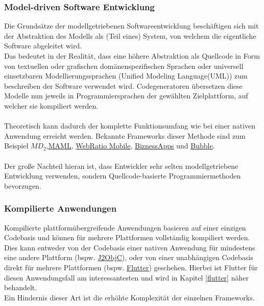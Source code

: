 \subsubsection{Model-driven Software Entwicklung}
Die Grundsätze der modellgetriebenen Softwareentwicklung beschäftigen sich mit der Abstraktion des Modells als (Teil eines) System, von welchem die eigentliche Software abgeleitet wird. \cite{stahl2006}\\
Das bedeutet in der Realität, dass eine höhere Abstraktion als Quellcode in Form von textuellen oder grafischen domänenspezifischen Sprachen oder universell einsetzbaren Modellierungssprachen (Unified Modeling Language(UML)) zum beschreiben der Software verwendet wird. 
Codegeneratoren übersetzen diese Modelle nun jeweils in Programmiersprachen der gewählten Zielplattform, auf welcher sie kompiliert werden.\\
\\
Theoretisch kann dadurch der komplette Funktionsumfang wie bei einer nativen Anwendung erreicht werden.
Bekannte Frameworks dieser Methode sind zum Beispiel \href{https://www.wi.uni-muenster.de/sites/wi/files/public/department/pi/publications/heitkoetter/cross-platform-model-driven-development-of-mobile-applications-with-md2.pdf}{$M\!D_2$},\href{https://www.sciencedirect.com/science/article/abs/pii/S1477842417301215}{MAML}, \href{https://www.webratio.com/site/content/en/home}{WebRatio Mobile}, \href{https://www.biznessapps.com/}{BiznessApps} und \href{https://bubble.io/}{Bubble}.\\
\\
Der große Nachteil hieran ist, dass Entwickler sehr selten modellgetriebene Entwicklung verwenden, sondern Quellcode-basierte Programmiermethoden bevorzugen. \cite{bjorn-hansen2020}
\subsubsection{Kompilierte Anwendungen}
\label{compilierte_anwendungen}
Kompilierte plattformübergreifende Anwendungen basieren auf einer einzigen Codebasis und können für mehrere Plattformen vollständig kompiliert werden. 
Dies kann entweder von der Codebasis einer nativen Anwendung für mindestens eine andere Plattform (bspw. \href{https://developers.google.com/j2objc/}{J2ObjC}), oder von einer unabhängigen Codebasis direkt für mehrere Plattformen (bspw. \href{https://flutter.dev/}{Flutter}) geschehen.
Hierbei ist Flutter für diesen Anwendungsfall am interessantesten und wird in Kapitel \ref{flutter} näher behandelt.\\
Ein Hindernis dieser Art ist die erhöhte Komplexität der einzelnen Frameworks.

